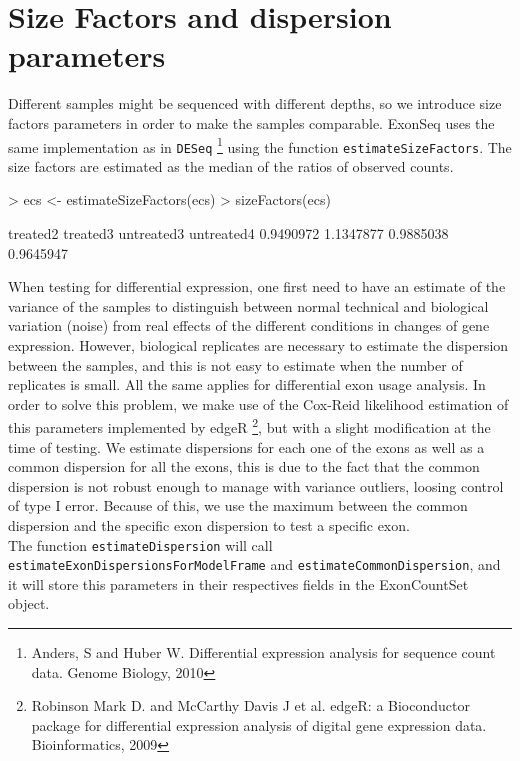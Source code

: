 \documentclass{article}
\begin{document}
\section{Size Factors and dispersion parameters}
Different samples might be sequenced with different depths, so we introduce size factors parameters in order to make the samples comparable.  ExonSeq uses the same implementation as in \texttt{DESeq} \footnote{Anders, S and Huber W. Differential expression analysis for sequence count data. Genome Biology, 2010} using the function \texttt{estimateSizeFactors}. The size factors are estimated as the median of the ratios of observed counts. 
\begin{Schunk}
\begin{Sinput}
> ecs <- estimateSizeFactors(ecs)
> sizeFactors(ecs)
\end{Sinput}
\begin{Soutput}
  treated2   treated3 untreated3 untreated4 
 0.9490972  1.1347877  0.9885038  0.9645947 
\end{Soutput}
\end{Schunk}
When testing for differential expression, one first need to have an estimate of the variance of the samples to distinguish between normal technical and biological variation (noise) from real effects of the different conditions in changes of gene expression.  However, biological replicates are necessary to estimate the dispersion between the samples, and this is not easy to estimate when the number of replicates is small. All the same applies for differential exon usage analysis.  In order to solve this problem, we make use of the Cox-Reid likelihood estimation of this parameters implemented by edgeR \footnote{Robinson Mark D. and McCarthy Davis J et al. edgeR: a Bioconductor package for differential expression analysis of digital gene expression data. Bioinformatics, 2009}, but with a slight modification at the time of testing. We estimate dispersions for each one of the exons as well as a common dispersion for all the exons, this is due to the fact that the common dispersion is not robust enough to manage with variance outliers, loosing control of type I error.  Because of this, we use the maximum between the common dispersion and the specific exon dispersion to test a specific exon. \\
The function \texttt{estimateDispersion} will call \texttt{estimateExonDispersionsForModelFrame} and \texttt{estimateCommonDispersion}, and it will store this parameters in their respectives fields in the ExonCountSet object.
\end{document}
